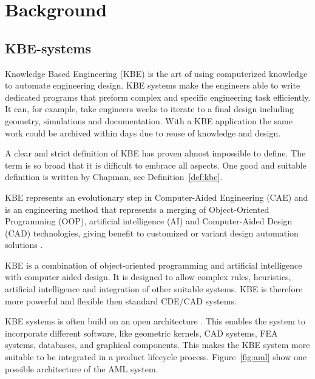 \section{Background}

\subsection{KBE-systems} %
\label{sub:kbe_systems}
Knowledge Based Engineering (KBE) is the art of using computerized knowledge to automate engineering design. KBE systems make the engineers able to write dedicated programs that preform complex and specific engineering task efficiently. It can, for example, take engineers weeks to iterate to a final design including geometry, simulations and documentation. With a KBE application the same work could be archived within days due to reuse of knowledge and design.

A clear and strict definition of KBE has proven almost impossible to define. The term is so broad that it is difficult to embrace all aspects. One good and suitable definition is written by Chapman, see Definition~\ref{def:kbe}.

\begin{mydef}
\label{def:kbe}
  KBE represents an evolutionary step in Computer-Aided Engineering (CAE) and is an engineering method that represents a merging of Object-Oriented Programming (OOP), artificial intelligence (AI) and Computer-Aided Design (CAD) technologies, giving benefit to customized or variant design automation solutions \citep{chapman}.
\end{mydef}


KBE is a combination of object-oriented programming and artificial
intelligence with computer aided design. It is designed to allow complex rules, heuristics, artificial intelligence and integration of other suitable systems. KBE is therefore more powerful and flexible then standard CDE/CAD systems.

KBE systems is often build on an open architecture \citep{chapman}. This enables the system to incorporate different software, like geometric kernels, CAD systems, FEA systems, databases, and graphical components. This makes the KBE system more suitable to be integrated in a product lifecycle process. Figure~\ref{fig:aml} show one possible architecture of the AML system.

